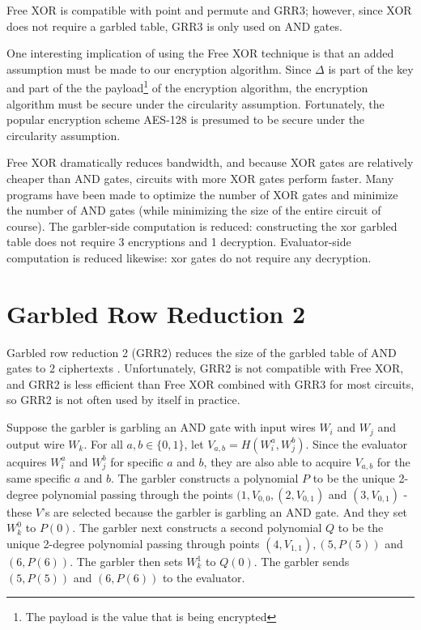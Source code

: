 Free XOR is compatible with point and permute and GRR3; however, since XOR does not require a garbled table, GRR3 is only used on AND gates.

One interesting implication of using the Free XOR technique is that an added assumption must be made to our encryption algorithm.
Since $\Delta$ is part of the key and part of the the payload\footnote{The payload is the value that is being encrypted} of the encryption algorithm, the encryption algorithm must be secure under the circularity assumption.
Fortunately, the popular encryption scheme AES-128 is presumed to be secure under the circularity assumption.

Free XOR dramatically reduces bandwidth, and because XOR gates are relatively cheaper than AND gates, circuits with more XOR gates perform faster.
Many programs have been made to optimize the number of XOR gates and minimize the number of AND gates (while minimizing the size of the entire circuit of course).
The garbler-side computation is reduced: constructing the xor garbled table does not require 3 encryptions and 1 decryption.
Evaluator-side computation is reduced likewise: xor gates do not require any decryption.

\section{Garbled Row Reduction 2}
Garbled row reduction 2 (GRR2) reduces the size of the garbled table of AND gates to $2$ ciphertexts \cite{grr}.
Unfortunately, GRR2 is not compatible with Free XOR, and GRR2 is less efficient than Free XOR combined with GRR3 for most circuits, so GRR2 is not often used by itself in practice.

Suppose the garbler is garbling an AND gate with input wires $W_i$ and $W_j$ and output wire $W_k$.
For all $a,b \in \{0,1\}$, let $V_{a,b} = H(W_i^a, W_j^b)$.
Since the evaluator acquires $W_i^a$ and $W_j^b$ for specific $a$ and $b$, they are also able to acquire $V_{a,b}$ for the same specific $a$ and $b$.
The garbler constructs a polynomial $P$ to be the unique 2-degree polynomial passing through the points $(1, V_{0,0}, (2, V_{0,1})$ and $(3, V_{0,1})$ - these $V$'s are selected because the garbler is garbling an AND gate.
And they set $W_k^0$ to $P(0)$.
The garbler next constructs a second polynomial $Q$ to be the unique 2-degree polynomial passing through points $(4, V_{1,1}), (5, P(5))$ and  $(6, P(6))$.
The garbler then sets $W_k^1$ to $Q(0)$.
The garbler sends $(5, P(5))$ and $(6, P(6))$ to the evaluator.

